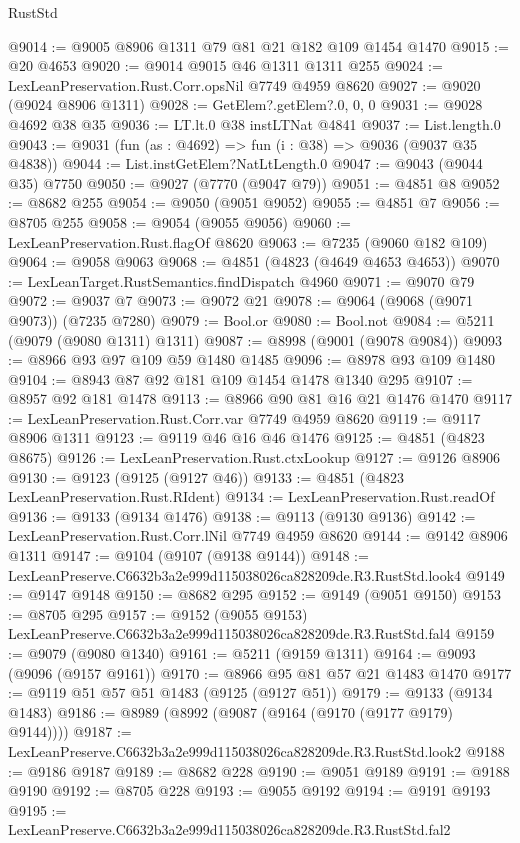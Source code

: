 \begin{lexlean}{RustStd}
\begin{coremodule}
@9014 := @9005 @8906 @1311 @79 @81 @21 @182 @109 @1454 @1470
@9015 := @20 @4653
@9020 := @9014 @9015 @46 @1311 @1311 @255
@9024 := LexLeanPreservation.Rust.Corr.opsNil @7749 @4959 @8620
@9027 := @9020 (@9024 @8906 @1311)
@9028 := GetElem?.getElem?.{0, 0, 0}
@9031 := @9028 @4692 @38 @35
@9036 := LT.lt.{0} @38 instLTNat @4841
@9037 := List.length.{0}
@9043 := @9031 (fun (as : @4692) => fun (i : @38) => @9036 (@9037 @35 @4838))
@9044 := List.instGetElem?NatLtLength.{0}
@9047 := @9043 (@9044 @35) @7750
@9050 := @9027 (@7770 (@9047 @79))
@9051 := @4851 @8
@9052 := @8682 @255
@9054 := @9050 (@9051 @9052)
@9055 := @4851 @7
@9056 := @8705 @255
@9058 := @9054 (@9055 @9056)
@9060 := LexLeanPreservation.Rust.flagOf @8620
@9063 := @7235 (@9060 @182 @109)
@9064 := @9058 @9063
@9068 := @4851 (@4823 (@4649 @4653 @4653))
@9070 := LexLeanTarget.RustSemantics.findDispatch @4960
@9071 := @9070 @79
@9072 := @9037 @7
@9073 := @9072 @21
@9078 := @9064 (@9068 (@9071 @9073)) (@7235 @7280)
@9079 := Bool.or
@9080 := Bool.not
@9084 := @5211 (@9079 (@9080 @1311) @1311)
@9087 := @8998 (@9001 (@9078 @9084))
@9093 := @8966 @93 @97 @109 @59 @1480 @1485
@9096 := @8978 @93 @109 @1480
@9104 := @8943 @87 @92 @181 @109 @1454 @1478 @1340 @295
@9107 := @8957 @92 @181 @1478
@9113 := @8966 @90 @81 @16 @21 @1476 @1470
@9117 := LexLeanPreservation.Rust.Corr.var @7749 @4959 @8620
@9119 := @9117 @8906 @1311
@9123 := @9119 @46 @16 @46 @1476
@9125 := @4851 (@4823 @8675)
@9126 := LexLeanPreservation.Rust.ctxLookup
@9127 := @9126 @8906
@9130 := @9123 (@9125 (@9127 @46))
@9133 := @4851 (@4823 LexLeanPreservation.Rust.RIdent)
@9134 := LexLeanPreservation.Rust.readOf
@9136 := @9133 (@9134 @1476)
@9138 := @9113 (@9130 @9136)
@9142 := LexLeanPreservation.Rust.Corr.lNil @7749 @4959 @8620
@9144 := @9142 @8906 @1311
@9147 := @9104 (@9107 (@9138 @9144))
@9148 := LexLeanPreserve.C6632b3a2e999d115038026ca828209de.R3.RustStd.look4
@9149 := @9147 @9148
@9150 := @8682 @295
@9152 := @9149 (@9051 @9150)
@9153 := @8705 @295
@9157 := @9152 (@9055 @9153) LexLeanPreserve.C6632b3a2e999d115038026ca828209de.R3.RustStd.fal4
@9159 := @9079 (@9080 @1340)
@9161 := @5211 (@9159 @1311)
@9164 := @9093 (@9096 (@9157 @9161))
@9170 := @8966 @95 @81 @57 @21 @1483 @1470
@9177 := @9119 @51 @57 @51 @1483 (@9125 (@9127 @51))
@9179 := @9133 (@9134 @1483)
@9186 := @8989 (@8992 (@9087 (@9164 (@9170 (@9177 @9179) @9144))))
@9187 := LexLeanPreserve.C6632b3a2e999d115038026ca828209de.R3.RustStd.look2
@9188 := @9186 @9187
@9189 := @8682 @228
@9190 := @9051 @9189
@9191 := @9188 @9190
@9192 := @8705 @228
@9193 := @9055 @9192
@9194 := @9191 @9193
@9195 := LexLeanPreserve.C6632b3a2e999d115038026ca828209de.R3.RustStd.fal2

\end{coremodule}
\end{lexlean}
